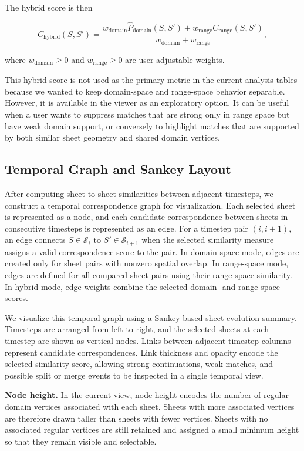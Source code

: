 \documentclass{vgtc}                          %
\newcommand{\Sheets}{\mathcal{S}}
\newcommand{\Sheet}{S}
\newcommand{\myparagraph}[1]{\vspace{1mm} \noindent \textbf{#1}}
\begin{document}
  The hybrid score is then

  \[
  C_\mathrm{hybrid}(\Sheet,\Sheet') =
  \frac{
  w_\mathrm{domain}\widehat{P}_\mathrm{domain}(\Sheet,\Sheet')
  +
  w_\mathrm{range}C_\mathrm{range}(\Sheet,\Sheet')
  }{
  w_\mathrm{domain}+w_\mathrm{range}
  },
  \]

  where $w_\mathrm{domain}\geq 0$ and $w_\mathrm{range}\geq 0$ are
  user-adjustable weights.

  This hybrid score is not used as the primary metric in the current analysis
  tables because we wanted to keep domain-space and range-space behavior
  separable. However, it is available in the viewer as an exploratory option. It
  can be useful when a user wants to suppress matches that are strong only in
  range space but have weak domain support, or conversely to highlight matches
  that are supported by both similar sheet geometry and shared domain vertices.

\subsection{Temporal Graph and Sankey Layout}
After computing sheet-to-sheet similarities between adjacent timesteps, we construct a temporal correspondence graph for visualization. Each selected sheet is represented as a node, and each candidate correspondence between sheets in consecutive timesteps is represented as an edge. For a timestep pair $(i,i+1)$, an edge connects $\Sheet\in\Sheets_i$ to $\Sheet'\in\Sheets_{i+1}$ when the selected similarity measure assigns a valid correspondence score to the pair. In domain-space mode, edges are created only for sheet pairs with nonzero spatial overlap. In range-space mode, edges are defined for all compared sheet pairs using their range-space similarity. In hybrid mode, edge weights combine the selected domain- and range-space scores.

We visualize this temporal graph using a Sankey-based sheet evolution summary. Timesteps are arranged from left to right, and the selected sheets at each timestep are shown as vertical nodes. Links between adjacent timestep columns represent candidate correspondences. Link thickness and opacity encode the selected similarity score, allowing strong continuations, weak matches, and possible split or merge events to be inspected in a single temporal view.


\myparagraph{Node height.} In the current view, node height encodes the number of regular domain vertices associated with each sheet. Sheets with more associated vertices are therefore drawn taller than sheets with fewer vertices. Sheets with no associated regular vertices are still retained and assigned a small minimum height so that they remain visible and selectable.
\end{document}
